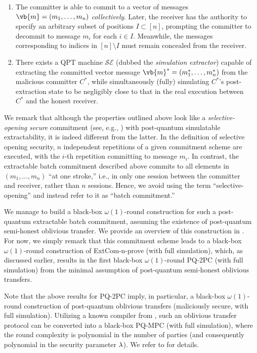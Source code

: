 \begin{enumerate}
\item 
The committer is able to commit to a vector of messages $\vb{m} = (m_1, \ldots, m_n)$ {\em collectively}. Later, the receiver has the authority to specify an arbitrary subset of positions $I \subset [n]$, prompting the committer to decommit to message $m_i$ for each $i \in I$. Meanwhile, the messages corresponding to indices in $[n] \setminus I$ must remain concealed from the receiver.

\item
There exists a QPT machine $\mathcal{SE}$ (dubbed the {\em simulation extractor}) capable of extracting the committed vector message $\vb{m}^* = (m^*_1, \ldots, m^*_n)$ from the malicious committer $C^*$, while simultaneously (fully) simulating $C^*$'s post-extraction state to be negligibly close to that in the real execution between $C^*$ and the honest receiver. 
\end{enumerate} 
We remark that although the properties outlined above look like a {\em selective-opening secure} commitment (see, e.g., \cite{JC:Hofheinz11}) with post-quantum simulatable extractability, it is indeed different from the latter. In the definition of selective opening security, $n$ independent repetitions of a given commitment scheme are executed, with the $i$-th repetition committing to message $m_i$. In contrast, the extractable batch commitment described above commits to all elements in $(m_1, \ldots, m_n)$ ``at one stroke,'' i.e., in only one session between the committer and receiver, rather than $n$ sessions. Hence, we avoid using the term ``selective-opening'' and instead refer to it as ``batch commitment.''
\fi

We manage to build a black-box $\omega(1)$-round construction for such a post-quantum extractable batch commitment, assuming the existence of post-quantum semi-honest oblivious transfer. We provide an overview of this construction in . For now, we simply remark that this commitment scheme leads to a black-box $\omega(1)$-round construction of ExtCom-n-prove (with full simulation), which, as discussed earlier, results in the first black-box $\omega(1)$-round PQ-2PC (with full simulation) from the minimal assumption of post-quantum semi-honest oblivious transfers.



 Note that the above results for PQ-2PC imply, in particular, a black-box $\omega(1)$-round construction of post-quantum oblivious transfers (maliciously secure, with full simulation). Utilizing a known compiler from \cite{C:IshPraSah08}, such an oblivious transfer protocol can be converted into a black-box PQ-MPC (with full simulation), where the round complexity is polynomial in the number of parties (and consequently polynomial in the security parameter $\lambda$). We refer to  for details.





